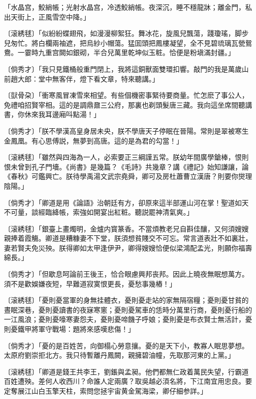 \begin{myquote}
「水晶宫，鮫綃帳；光射水晶宫，冷透鮫綃帳。夜深沉，睡不穩龍牀；離金門，私出天街上，正風雪空中降。」　

{\markfont〔滚綉毬〕}「似紛紛蝶翅飛，如漫漫柳絮狂。舞冰花，旋風兒飄蕩，踐瓊瑤，脚步兒匆忙。將白欄兩袖遮，把烏紗小帽蕩。猛囬頭把鳳樓凝望，全不見碧琉璃瓦甇鴛鴦。一霎時九重宫闕如銀砌，半合兒萬里乾坤似玉粧。恰便是粉塡滿封疆。」

{\markfont〔倘秀才〕}「我只見鐵桶般重門閉上，我將這銅獸面雙環扣響。敲門的我是萬歲山前趙大郎：堂中無客伴，燈下看文章，特來聽講。」

{\markfont〔獃骨朶〕}「衝寒風冒凍雪來相望。有些個機密事緊待要商量。忙怎麽了事公人，免禮咱招賢宰相。這的是調鼎鼐三公府，那裏也剃頭髮唐三藏。我向這坐席間聽講書，你休來我耳邊廂呌點湯！」

{\markfont〔倘秀才〕}「朕不學漢高皇身居未央，朕不學唐天子停眠在晉陽。常則是翠被寒生金鳳凰。有心思傅説，無夢到高唐。這的是為君的勾當！」

{\markfont〔滚綉毬〕}「雖然與四海為一人，必索要正三綱謹五常。朕幼年間廣學鎗棒，恨則恨未曾到孔子門墻。《尚書》是幾篇？《毛詩》共幾章？講《禮記》始知謙讓，論《春秋》可鑑興亡。朕待學禹湯文武宗堯舜，卿可及房杜蕭曹立漢唐？則要你爕理陰陽。」

{\markfont〔倘秀才〕}「卿道是用《論語》治朝廷有方，卻原來這半部運山河在掌！聖道如天不可量，談經臨絳帳，索強如開宴出紅粧。聽説罷神清氣爽。」

{\markfont〔滚綉毬〕}「銀臺上畫燭明，金爐内寳篆香。不當煩教老兄自斟佳釀，又何須嫂嫂親捧着霞觴。卿道是糟糠妻不下堂，朕須想貧賤交不可忘。常言道表壯不如裏壯，妻若賢夫免災殃。朕得卿如太甲逢伊尹，卿得嫂嫂恰便似梁鴻配孟光，則願你福壽綿長。」

{\markfont〔倘秀才〕}「但歇息呵論前王後王，恰合眼慮興邦丧邦。因此上曉夜無眠想萬方。須不是歡娛嫌夜短，早難道寂寞恨更長，憂愁事幾樁！」

{\markfont〔滚綉毬〕}「憂則憂當軍的身無挂體衣，憂則憂走站的家無隔宿糧；憂則憂甘貧的晝眠深巷，憂則憂讀書的夜寐寒窻；憂則憂駕車的恁時分萬里行商，憂則憂行船的一江風浪；憂則憂嚎寒妻怨夫，憂則憂啼饑子呼娘；憂則憂是布衣賢士無活計，憂則憂鐵甲將軍守戰場：題將來感嘆悲傷！」

{\markfont〔倘秀才〕}「憂的是百姓苦，向御榻心勞意攘。憂的是天下小，教寡人眠思夢想。太原府劉崇拒北方。我只待暫離丹鳳闕，親擁碧油幢，先取那河東的上黨。」

{\markfont〔滚綉毬〕}「卿道是錢王共李王，劉鋹與孟昶。他們都無仁政着萬民失望，行霸道百姓遭殃。差何人收西川？命誰人定兩廣？取吳越必湏名將，下江南宜用忠良。要定奪展江山白玉擎天柱，索問您拯宇宙黄金駕海梁，卿仔細参詳。」


\end{myquote}

